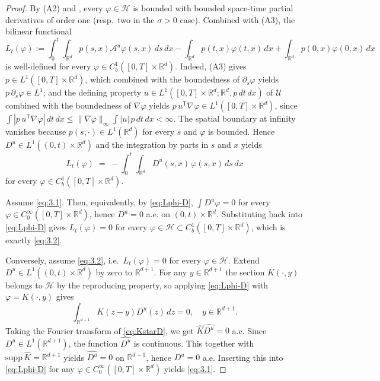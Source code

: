 \documentclass[11pt,leqno]{article}
\theoremstyle{plain}
\theoremstyle{remark}
\theoremstyle{definition}
\numberwithin{equation}{section}
\numberwithin{figure}{section}
\numberwithin{table}{section}
\begin{document}
\begin{proof}
By (A2) and \cite[Theorem~10.45]{Wendland2005}, every
$\varphi\in\mathcal{H}$ is bounded with bounded space-time partial
derivatives of order one (resp.\ two in the $\sigma>0$ case).
Combined with (A3), the bilinear functional
\begin{equation}\label{eq:Lphi}
 L_t(\varphi):=\int_0^t\!\!\int_{\mathbb{R}^d}p(s,x)\mathcal{A}^u\varphi(s,x)\,ds\,dx
 -\int_{\mathbb{R}^d}p(t,x)\varphi(t,x)\,dx
 +\int_{\mathbb{R}^d}p(0,x)\varphi(0,x)\,dx
\end{equation}
is well-defined for every $\varphi\in C_b^1([0,T]\times\mathbb{R}^d)$.
Indeed, (A3) gives $p\in L^1([0,T]\times\mathbb{R}^d)$, which combined
with the boundedness of $\partial_s\varphi$ yields
$p\,\partial_s\varphi\in L^1$; and the defining property
$u\in L^1([0,T]\times\mathbb{R}^d;\mathbb{R}^d,p\,dt\,dx)$ of
$\mathcal{U}$ combined with the boundedness of $\nabla\varphi$ yields
$p\,u^{\mathsf{T}}\nabla\varphi\in L^1([0,T]\times\mathbb{R}^d)$, since
$\int|p\,u^{\mathsf{T}}\nabla\varphi|\,dt\,dx
\le\|\nabla\varphi\|_\infty\!\int|u|\,p\,dt\,dx<\infty$.
The spatial boundary at infinity vanishes because $p(s,\cdot)\in L^1(\mathbb{R}^d)$
for every $s$ and $\varphi$ is bounded.
Hence $D^u\in L^1((0,t)\times\mathbb{R}^d)$ and the integration by
parts in $s$ and $x$ yields
\begin{equation}\label{eq:Lphi-D}
 L_t(\varphi) \;=\; -\int_0^t\!\!\int_{\mathbb{R}^d}D^u(s,x)\,\varphi(s,x)\,ds\,dx
 \end{equation}
for every $\varphi\in C_b^1([0,T]\times\mathbb{R}^d)$. 

Assume \eqref{eq:3.1}. Then, equivalently, by
\eqref{eq:Lphi-D}, $\int D^u\varphi=0$ for every
$\varphi\in C_0^\infty([0,T]\times\mathbb{R}^d)$, hence $D^u=0$ a.e.
on $(0,t)\times\mathbb{R}^d$.  Substituting back into \eqref{eq:Lphi-D}
gives $L_t(\varphi)=0$ for every $\varphi\in\mathcal{H}\subset C_b^1([0,T]\times\mathbb{R}^d)$, which is exactly \eqref{eq:3.2}.

Conversely, assume \eqref{eq:3.2}, i.e.\ $L_t(\varphi)=0$
for every $\varphi\in\mathcal{H}$.  Extend $D^u\in L^1((0,t)\times\mathbb{R}^d)$
by zero to $\mathbb{R}^{d+1}$.  For any $y\in\mathbb{R}^{d+1}$ the
section $K(\cdot,y)$ belongs to $\mathcal{H}$ by the reproducing
property, so applying \eqref{eq:Lphi-D} with $\varphi=K(\cdot,y)$
gives
\begin{equation}\label{eq:KstarD}
 \int_{\mathbb{R}^{d+1}}K(z-y)D^u(z)\,dz = 0, \quad y\in\mathbb{R}^{d+1}.
\end{equation}
Taking the Fourier transform of \eqref{eq:KstarD}, we get $\widehat{K}\widehat{D^u}=0$ a.e. 
Since $D^u\in L^1(\mathbb{R}^{d+1})$, the function $\widehat{D^u}$ is continuous. This together with
$\mathrm{supp}\,\widehat{K}=\mathbb{R}^{d+1}$ yields $\widehat{D^u}= 0$ on $\mathbb{R}^{d+1}$, hence
$D^u=0$ a.e.  Inserting this into \eqref{eq:Lphi-D} for any
$\varphi\in C_0^\infty([0,T]\times\mathbb{R}^d)$ yields \eqref{eq:3.1}. 
\end{proof}
\end{document}
